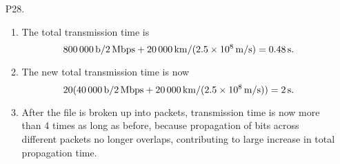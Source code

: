 \documentclass{article}
\begin{document}
\begin{enumerate}
    \item[P28.] \begin{enumerate}
        \item The total transmission time is
        \[
            \SI{800000}{b} / \SI{2}{Mbps} + \SI{20000}{km} / (\SI{2.5d8}{m/s}) = \SI{0.48}{s}.
        \]
        \item The new total transmission time is now
        \[
            20(\SI{40000}{b} / \SI{2}{Mbps} + \SI{20000}{km} / (\SI{2.5d8}{m/s})) = \SI{2}{s}.
        \]
        \item After the file is broken up into packets, transmission time is now more than 4 times as long as before, because propagation of bits across different packets no longer overlaps, contributing to large increase in total propagation time.
    \end{enumerate}
\end{enumerate}
\end{document}
